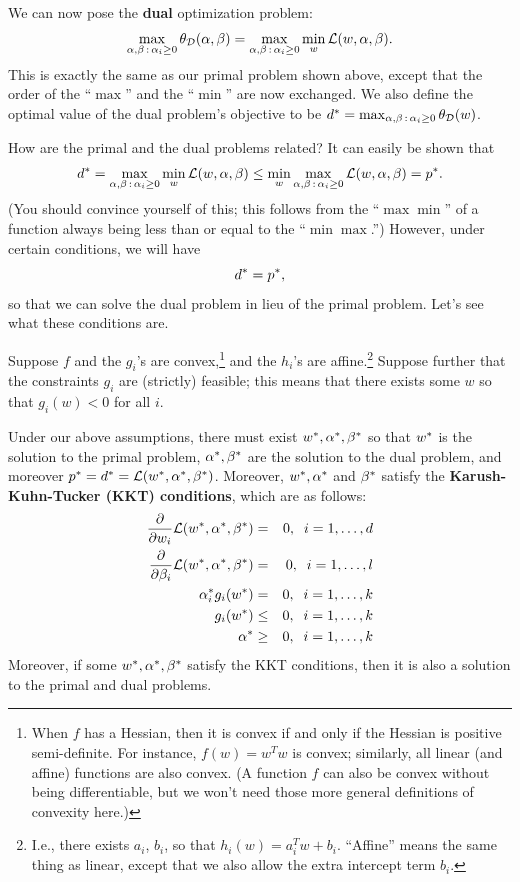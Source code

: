 \documentclass{article}
\begin{document}
We can now pose the {\bf dual} optimization problem:
\[
\max_{ \alpha, \beta\, :\, \alpha_i \geq 0 } \theta_{\cal D}(\alpha, \beta) =
\max_{ \alpha, \beta\, :\, \alpha_i \geq 0 } \min_w {\cal L}(w,\alpha,\beta).
\]
This is exactly the same as our primal problem shown above, except that the order of the
``$\max$'' and the ``$\min$'' are now exchanged.  We also define the optimal value of the
dual problem's objective to be ${d^{\ast}} =
\max_{ \alpha, \beta\, :\, \alpha_i \geq 0 } \theta_{\cal D}(w)$.

How are the primal and the dual problems related?  It can easily be shown that
\[
{d^{\ast}} =
\max_{ \alpha, \beta\, :\, \alpha_i \geq 0 } \min_w {\cal L}(w,\alpha,\beta) \leq
\min_w \max_{ \alpha, \beta\, :\, \alpha_i \geq 0 } {\cal L}(w,\alpha,\beta) = {p^{\ast}}.
\]
(You should convince yourself of this; this follows from the ``$\max \min$'' of a
function always being less than or equal to the ``$\min \max$.'')  However, under certain
conditions, we will have
\[
{d^{\ast}} = {p^{\ast}},
\]
so that we can solve the dual problem in lieu of the primal problem.  Let's see what
these conditions are.

Suppose $f$ and the $g_i$'s are convex,\footnote{When $f$ has a Hessian, then it is convex if
and only if the Hessian is positive semi-definite.
For instance, $f(w) = w^Tw$ is convex; similarly, all linear (and affine) functions are
also convex.
(A function $f$ can also be convex without
being differentiable, but we won't need those more general definitions of convexity here.)}
and the $h_i$'s are affine.\footnote{I.e., there exists $a_i$, $b_i$, so that $h_i(w) = a_i^Tw + b_i$.
``Affine'' means the same thing as linear, except that we also allow the extra intercept term $b_i$.}
Suppose further that the constraints $g_i$ are (strictly) feasible; this means that there
exists some $w$ so that $g_i(w) < 0$ for all $i$.

Under our above assumptions, there must exist ${w^{\ast}}, \alpha^{\ast}, {\beta^{\ast}}$ so that ${w^{\ast}}$ is
the solution to the primal problem, $\alpha^{\ast}, {\beta^{\ast}}$ are the solution to the dual problem, and
moreover ${p^{\ast}} = {d^{\ast}} = {\cal L}({w^{\ast}}, \alpha^{\ast},{\beta^{\ast}})$.  Moreover,
${w^{\ast}}, \alpha^{\ast}$ and ${\beta^{\ast}}$ satisfy the {\bf Karush-Kuhn-Tucker (KKT) conditions}, which are
as follows:
\begin{eqnarray}
\frac{\partial}{\partial w_i} {\cal L}({w^{\ast}},\alpha^{\ast},{\beta^{\ast}}) &=& 0, \;\; i=1,\ldots, {d} \label{eqn-kkt1} \\
\frac{\partial}{\partial \beta_i} {\cal L}({w^{\ast}},\alpha^{\ast},{\beta^{\ast}}) &=& 0, \;\; i=1,\ldots, l \\
{\alpha_i^{\ast}} g_i({w^{\ast}}) &=& 0, \;\; i=1,\ldots, k        \label{dual-complementarity}     \\
g_i({w^{\ast}}) &\leq& 0, \;\; i=1,\ldots, k \\
\alpha^{\ast}  &\geq& 0, \;\; i=1,\ldots, k \label{eqn-kkt5}
\end{eqnarray}
Moreover, if some ${w^{\ast}}, \alpha^{\ast}, {\beta^{\ast}}$ satisfy the KKT conditions, then it is also
a solution to the primal and dual problems.
\end{document}
